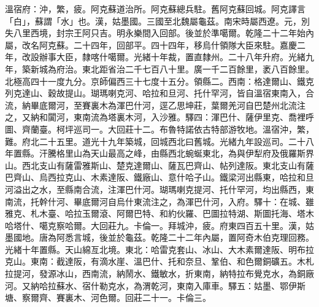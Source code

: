 \begin{pinyinscope}
溫宿府：沖，繁，疲。阿克蘇道治所。阿克蘇總兵駐。舊阿克蘇回城。阿克譯言「白」，蘇謂「水」也。漢，姑墨國。三國至北魏屬龜茲。南宋時屬西遼。元，別失八里西境，封宗王阿只吉。明永樂間入回部。後並於準噶爾。乾隆二十二年始內屬，改名阿克蘇。二十四年，回部平。四十四年，移烏什領隊大臣來駐。嘉慶二年，改設辦事大臣，隸喀什噶爾。光緒十年裁，置直隸州。二十八年升府。光緒九年，築新城為府治。東北距省治二千七百八十里。廣一千二百餘里，袤八百餘里。北極高四十一度九分。京師偏西三十七度十五分。領縣二。西南：格達爾山、鐵克列克達山、穀故提山。瑚瑪喇克河、哈拉和旦河、托什罕河，皆自溫宿東南入，合流，納畢底爾河，至賽裏木為渾巴什河，逕乙思坤莊，葉爾羌河自巴楚州北流注之，又納和闐河，東南流為塔裏木河，入沙雅。驛四：渾巴什、薩伊里克、喬裡呼圖、齊蘭臺。柯坪巡司一。大回莊十二。布魯特諾依古特部游牧地。溫宿沖，繁，難。府北二十五里。道光十九年築城，回城西北曰舊城。光緒九年設巡司。二十八年置縣。汗騰格里山為天山最高之峰，由縣西北蜿蜒東北，為與伊犁府及俄羅斯界山。西北支山有薩雷雅斯山、楚克達爾山、薩瓦巴齊山、帖列達阪。東北支山有薩巴齊山、烏西拉克山、木素達阪、鐵廠山、意什哈子山。鐵梁河出縣東，哈拉和旦河溢出之水，至縣南合流，注渾巴什河。瑚瑪喇克提河、托什罕河，均出縣西，東南流，托幹什河、畢底爾河自烏什東流注之，為渾巴什河，入府。驛十：在城、雖雅克、札木臺、哈拉玉爾滾、阿爾巴特、和約伙羅、巴圖拉特湖、斯圖托海、塔木哈塔什、噶克察哈爾。大回莊九。卡倫一。拜城沖，疲。府東四百五十里。漢，姑墨國地。唐為阿悉言城，後並於龜茲。乾隆二十二年內屬，置阿奇木伯克理回務。光緒十年置縣。天山綿亙北境。東北：哈雷克套山、冰山、大木素爾達阪、明布拉克山。東南：截達阪，有滴水崖、溫巴什、托和奈旦、鞏伯、和色爾銅礦五。木札拉提河，發源冰山，西南流，納鬧水、鐵敏水，折東南，納特拉布覺克水，為銅廠河。又納哈拉蘇水、宿什勒克水，為渭乾河，東南入庫車。驛五：姑墨、鄂伊斯塘、察爾齊、賽裏木、河色爾。回莊二十一。卡倫三。


\end{pinyinscope}
